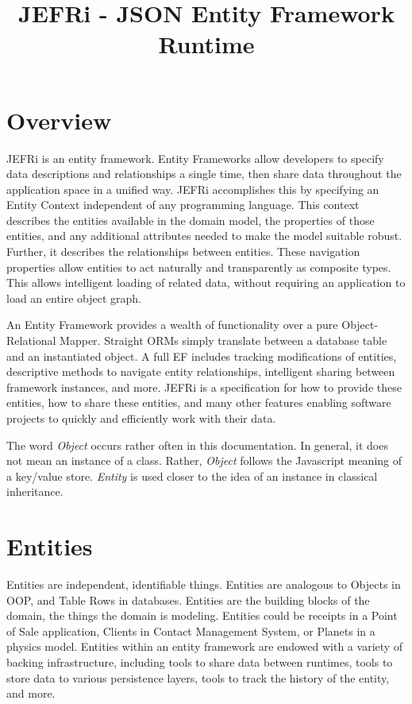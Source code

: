 \documentclass{article}
\begin{document}
\title{JEFRi - JSON Entity Framework Runtime}
\maketitle
\tableofcontents
\newpage
\linespread{1.6}

\section{Overview}

JEFRi is an entity framework. Entity Frameworks allow developers to specify
data descriptions and relationships a single time, then share data throughout
the application space in a unified way. JEFRi accomplishes this by specifying
an Entity Context independent of any programming language. This context
describes the entities available in the domain model, the properties of those
entities, and any additional attributes needed to make the model suitable
robust. Further, it describes the relationships between entities. These
navigation properties allow entities to act naturally and transparently as
composite types. This allows intelligent loading of related data, without
requiring an application to load an entire object graph.

An Entity Framework provides a wealth of functionality over a pure
Object-Relational Mapper. Straight ORMs simply translate between a database
table and an instantiated object. A full EF includes tracking modifications
of entities, descriptive methods to navigate entity relationships, intelligent
sharing between framework instances, and more. JEFRi is a specification for how
to provide these entities, how to share these entities, and many other features
enabling software projects to quickly and efficiently work with their data.

The word {\sl Object} occurs rather often in this documentation. In general,
it does not mean an instance of a class. Rather, {\sl Object} follows the
Javascript meaning of a key/value store. {\sl Entity} is used closer to the
idea of an instance in classical inheritance.

\section{Entities}

Entities are independent, identifiable things. Entities are analogous to Objects
in OOP, and Table Rows in databases. Entities are the building blocks of the
domain, the things the domain is modeling. Entities could be receipts in a Point
of Sale application, Clients in Contact Management System, or Planets in a
physics model. Entities within an entity framework are endowed with a variety of
backing infrastructure, including tools to share data between runtimes, tools to
store data to various persistence layers, tools to track the history of the
entity, and more.
\end{document}

